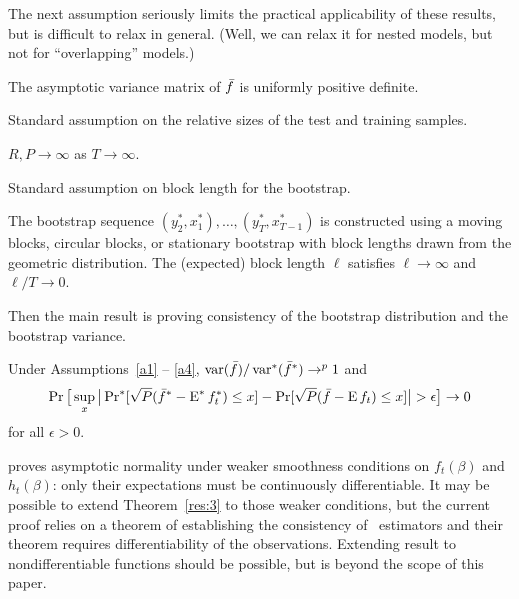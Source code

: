 \documentclass[12pt,fleqn]{article}
\begin{document}
The next assumption seriously limits the practical applicability of
these results, but is difficult to relax in general. (Well, we can
relax it for nested models, but not for ``overlapping'' models.)

\begin{asmp}\label{a6}
  The asymptotic variance matrix of $\bar f$ is uniformly positive definite.
\end{asmp}

Standard assumption on the relative sizes of the test and training samples.

\begin{asmp}\label{a7}
  $R, P \to \infty$ as $T \to \infty$.
\end{asmp}

Standard assumption on block length for the bootstrap.

\begin{asmp}\label{a4}
  The bootstrap sequence $(y_2^*, x_1^*),\dots,(y_T^*, x_{T-1}^*)$ is
  constructed using a moving blocks, circular blocks, or stationary
  bootstrap with block lengths drawn from the geometric distribution.
  The (expected) block length $\ell$ satisfies $\ell \to \infty$
  and $\ell/T \to 0$.
\end{asmp}

Then the main result is proving consistency of the bootstrap
distribution and the bootstrap variance.

\begin{thm}\label{res:3}
  Under Assumptions~\ref{a1} -- \ref{a4}, $\operatorname{var}(\bar f)/\operatorname{var}^*(\bar f^*)
  \to^p 1$ and
  \begin{equation}\label{eq:15}
    \operatorname{Pr}\big[\sup_x \big\lvert \operatorname{Pr}^*[\sqrt{P} (\bar f^* - \operatorname{E}^* f_t^*) \leq x]
    - \operatorname{Pr}[\sqrt{P}( \bar{f} - \operatorname{E} f_t) \leq x] \big\rvert > \epsilon\big] \to 0
  \end{equation}
  for all $\epsilon > 0$.
\end{thm}

\begin{rem}
  \citet{Mcc:00} proves asymptotic normality under weaker smoothness
  conditions on $f_t(\beta)$ and $h_t(\beta)$: only their expectations
  must be continuously differentiable.  It may be possible to extend
  Theorem~\ref{res:3} to those weaker conditions, but the current
  proof relies on a theorem of  establishing the
  consistency of \hac\ estimators and their theorem requires differentiability of
  the observations.  Extending  result to
  nondifferentiable functions should be possible, but is beyond the
  scope of this paper.
\end{rem}
\end{document}
